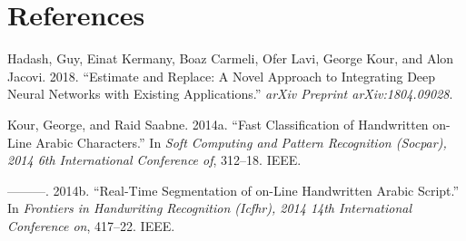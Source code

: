 \documentclass{article}
\begin{document}
\hypertarget{references}{%
\section*{References}\label{references}}

\hypertarget{refs}{}
\leavevmode\hypertarget{ref-hadash2018estimate}{}%
Hadash, Guy, Einat Kermany, Boaz Carmeli, Ofer Lavi, George Kour, and
Alon Jacovi. 2018. ``Estimate and Replace: A Novel Approach to
Integrating Deep Neural Networks with Existing Applications.''
\emph{arXiv Preprint arXiv:1804.09028}.

\leavevmode\hypertarget{ref-kour2014fast}{}%
Kour, George, and Raid Saabne. 2014a. ``Fast Classification of
Handwritten on-Line Arabic Characters.'' In \emph{Soft Computing and
Pattern Recognition (Socpar), 2014 6th International Conference of},
312--18. IEEE.

\leavevmode\hypertarget{ref-kour2014real}{}%
---------. 2014b. ``Real-Time Segmentation of on-Line Handwritten Arabic
Script.'' In \emph{Frontiers in Handwriting Recognition (Icfhr), 2014
14th International Conference on}, 417--22. IEEE.



\end{document}
